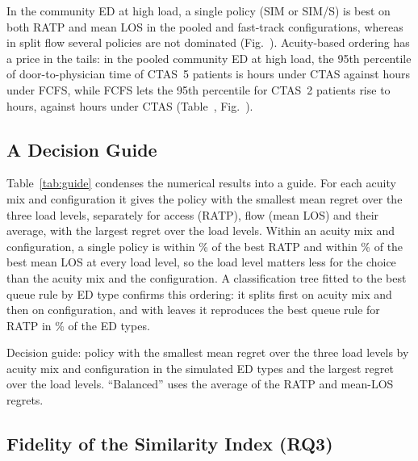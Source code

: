 In the community ED at high load, a single policy (SIM or SIM/S) is best on both RATP and mean LOS in the pooled and fast-track configurations, whereas in split flow several policies are not dominated (Fig.~). Acuity-based ordering has a price in the tails: in the pooled community ED at high load, the 95th percentile of door-to-physician time of CTAS~5 patients is \TailPNinetyFiveCtasCtasFive{} hours under CTAS against \TailPNinetyFiveFcfsCtasFive{} hours under FCFS, while FCFS lets the 95th percentile for CTAS~2 patients rise to \TailPNinetyFiveFcfsCtasTwo{} hours, against \TailPNinetyFiveCtasCtasTwo{} hours under CTAS (Table~, Fig.~).



\subsection{A Decision Guide}

Table~\ref{tab:guide} condenses the numerical results into a guide. For each acuity mix and configuration it gives the policy with the smallest mean regret over the three load levels, separately for access (RATP), flow (mean LOS) and their average, with the largest regret over the load levels. Within an acuity mix and configuration, a single policy is within \GuideMaxRegretRatp\% of the best RATP and within \GuideMaxRegretLos\% of the best mean LOS at every load level, so the load level matters less for the choice than the acuity mix and the configuration. A classification tree fitted to the best queue rule by ED type confirms this ordering: it splits first on acuity mix and then on configuration, and with \TreeRatpLeaves{} leaves it reproduces the best queue rule for RATP in \TreeRatpAcc\% of the ED types.

\begin{table}[!htbp]
\centering
\caption{Decision guide: policy with the smallest mean regret over the three load levels by acuity mix and configuration in the simulated ED types and the largest regret over the load levels. ``Balanced'' uses the average of the RATP and mean-LOS regrets.}
\label{tab:guide}
\footnotesize
\begin{adjustbox}{max width=\linewidth}\end{adjustbox}
\end{table}

\subsection{Fidelity of the Similarity Index (RQ3)}

